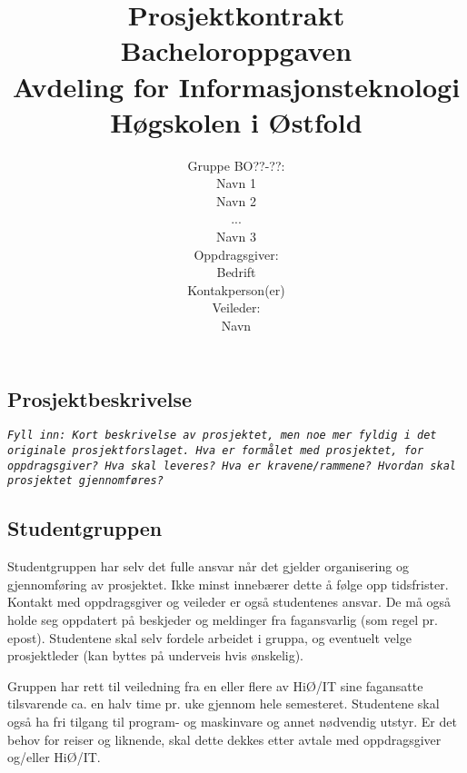 \documentclass[11pt,a4paper]{report}
\begin{document}
\pagestyle{empty}

\title{
{\Huge  \vspace{-2cm} Prosjektkontrakt}\\
\vspace{2cm}
Bacheloroppgaven\\
Avdeling for Informasjonsteknologi\\
Høgskolen i Østfold
}

\author{
Gruppe BO??-??: \\
Navn 1\\
Navn 2\\
...\\
Navn 3 \bigskip\\
Oppdragsgiver: \\
Bedrift\\
Kontakperson(er)\bigskip\\
Veileder: \\
Navn\bigskip}

\maketitle

\subsection*{Prosjektbeskrivelse}

\texttt{\textit{Fyll inn: Kort  beskrivelse av prosjektet, men noe mer fyldig i det originale prosjektforslaget. Hva er formålet med prosjektet, for oppdragsgiver? Hva skal leveres? Hva er kravene/rammene? Hvordan skal prosjektet gjennomføres?}}

\subsection*{Studentgruppen}

Studentgruppen har selv det fulle ansvar når det gjelder organisering og gjennomføring av prosjektet. Ikke minst innebærer dette å følge opp tidsfrister. Kontakt med oppdragsgiver og veileder er også studentenes ansvar. De må også holde seg oppdatert på beskjeder og meldinger fra fagansvarlig (som regel pr. epost). Studentene skal selv fordele arbeidet i gruppa, og eventuelt velge prosjektleder (kan byttes på underveis hvis ønskelig). 

Gruppen har rett til veiledning fra en eller flere av HiØ/IT sine fagansatte tilsvarende ca. en halv time pr. uke gjennom hele semesteret. Studentene skal også ha fri tilgang til program- og maskinvare og annet nødvendig utstyr. Er det behov for reiser og liknende, skal dette dekkes etter avtale med oppdragsgiver og/eller HiØ/IT. 
\end{document}

